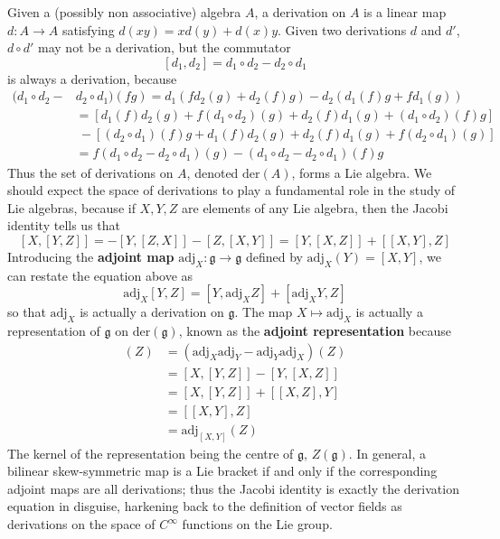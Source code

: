 \begin{example}
    Given a (possibly non associative) algebra $A$, a derivation on $A$ is a linear map $d: A \to A$ satisfying $d(xy) = xd(y) + d(x)y$. Given two derivations $d$ and $d'$, $d \circ d'$ may not be a derivation, but the commutator
    \[ [d_1, d_2] = d_1 \circ d_2 - d_2 \circ d_1 \]
    is always a derivation, because
    \begin{align*}
        (d_1 \circ d_2 - &d_2 \circ d_1)(fg) = d_1(f d_2(g) + d_2(f) g) - d_2(d_1(f) g + f d_1(g))\\
        &= [d_1(f) d_2(g) + f (d_1 \circ d_2)(g) + d_2(f) d_1(g) + (d_1 \circ d_2)(f) g]\\
        &\ - [(d_2 \circ d_1)(f) g + d_1(f) d_2(g) + d_2(f) d_1(g) + f (d_2 \circ d_1)(g)]\\
        &= f(d_1 \circ d_2 - d_2 \circ d_1)(g) - (d_1 \circ d_2 - d_2 \circ d_1)(f) g
    \end{align*}
    Thus the set of derivations on $A$, denoted $\text{der}(A)$, forms a Lie algebra. We should expect the space of derivations to play a fundamental role in the study of Lie algebras, because if $X,Y,Z$ are elements of any Lie algebra, then the Jacobi identity tells us that
    \[ [X,[Y,Z]] = - [Y,[Z,X]] - [Z,[X,Y]] = [Y,[X,Z]] + [[X,Y],Z] \]
    Introducing the {\bf adjoint map} $\text{adj}_X: \mathfrak{g} \to \mathfrak{g}$ defined by $\text{adj}_X(Y) = [X,Y]$, we can restate the equation above as
    \[ \text{adj}_X[Y,Z] = [Y, \text{adj}_X Z] + [\text{adj}_XY, Z] \]
    so that $\text{adj}_X$ is actually a derivation on $\mathfrak{g}$. The map $X \mapsto \text{adj}_X$ is actually a representation of $\mathfrak{g}$ on $\text{der}(\mathfrak{g})$, known as the {\bf adjoint representation} because
    \begin{align*}
        [\text{adj}_X, \text{adj}_Y](Z) &= (\text{adj}_X \text{adj}_Y - \text{adj}_Y \text{adj}_X)(Z)\\
        &= [X,[Y,Z]] - [Y,[X,Z]]\\
        &= [X,[Y,Z]] + [[X,Z],Y]\\
        &= [[X,Y],Z]\\
        &= \text{adj}_{[X,Y]}(Z)
    \end{align*}
    The kernel of the representation being the centre of $\mathfrak{g}$, $Z(\mathfrak{g})$. In general, a bilinear skew-symmetric map is a Lie bracket if and only if the corresponding adjoint maps are all derivations; thus the Jacobi identity is exactly the derivation equation in disguise, harkening back to the definition of vector fields as derivations on the space of $C^\infty$ functions on the Lie group.
\end{example}


